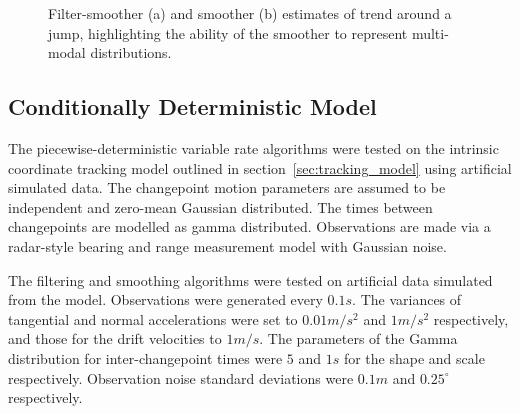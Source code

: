 \documentclass[peerreview,11pt,draftcls,onecolumn]{IEEEtran}
\begin{document}
\begin{figure}[!t]
\centering
{}
\caption{Filter-smoother (a) and smoother (b) estimates of trend around a jump, highlighting the ability of the smoother to represent multi-modal distributions.}
\label{fig:finance_multimodality}
\end{figure}



\subsection{Conditionally Deterministic Model}

The piecewise-deterministic variable rate algorithms were tested on the intrinsic coordinate tracking model outlined in section~\ref{sec:tracking_model} using artificial simulated data. The changepoint motion parameters are assumed to be independent and zero-mean Gaussian distributed. The times between changepoints are modelled as gamma distributed. Observations are made via a radar-style bearing and range measurement model with Gaussian noise.

The filtering and smoothing algorithms were tested on artificial data simulated from the model. Observations were generated every $0.1s$. The variances of tangential and normal accelerations were set to $0.01m/s^2$ and $1m/s^2$ respectively, and those for the drift velocities to $1m/s$. The parameters of the Gamma distribution for inter-changepoint times were $5$ and $1s$ for the shape and scale respectively. Observation noise standard deviations were $0.1m$ and $0.25^{\circ}$ respectively.
\end{document}
